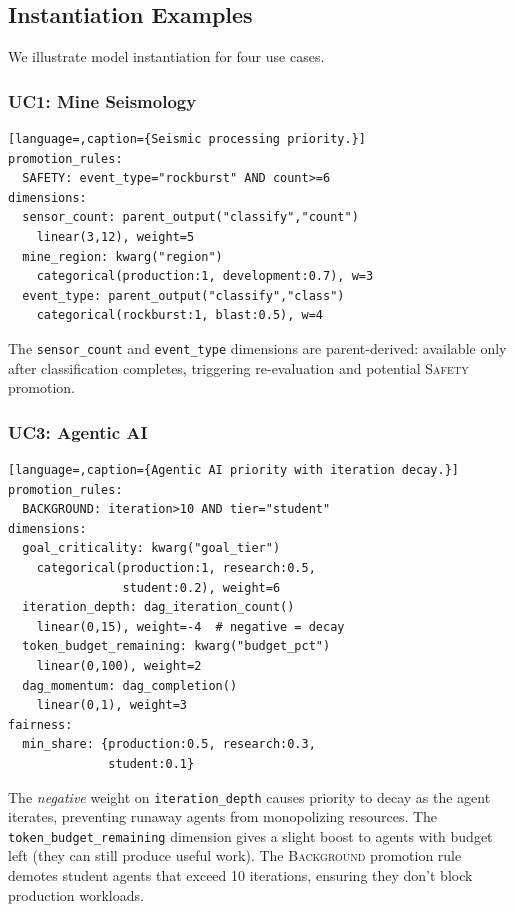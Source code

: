 \documentclass[conference]{IEEEtran}
\begin{document}
\subsection{Instantiation Examples}

We illustrate model instantiation for four use cases.

\subsubsection{UC1: Mine Seismology}

\begin{lstlisting}[language=,caption={Seismic processing priority.}]
promotion_rules:
  SAFETY: event_type="rockburst" AND count>=6
dimensions:
  sensor_count: parent_output("classify","count")
    linear(3,12), weight=5
  mine_region: kwarg("region")
    categorical(production:1, development:0.7), w=3
  event_type: parent_output("classify","class")
    categorical(rockburst:1, blast:0.5), w=4
\end{lstlisting}

The \texttt{sensor\_count} and \texttt{event\_type} dimensions are parent-derived: available only after classification completes, triggering re-evaluation and potential \textsc{Safety} promotion.

\subsubsection{UC3: Agentic AI}

\begin{lstlisting}[language=,caption={Agentic AI priority with iteration decay.}]
promotion_rules:
  BACKGROUND: iteration>10 AND tier="student"
dimensions:
  goal_criticality: kwarg("goal_tier")
    categorical(production:1, research:0.5,
                student:0.2), weight=6
  iteration_depth: dag_iteration_count()
    linear(0,15), weight=-4  # negative = decay
  token_budget_remaining: kwarg("budget_pct")
    linear(0,100), weight=2
  dag_momentum: dag_completion()
    linear(0,1), weight=3
fairness:
  min_share: {production:0.5, research:0.3,
              student:0.1}
\end{lstlisting}

The \emph{negative} weight on \texttt{iteration\_depth} causes priority to decay as the agent iterates, preventing runaway agents from monopolizing resources. The \texttt{token\_budget\_remaining} dimension gives a slight boost to agents with budget left (they can still produce useful work). The \textsc{Background} promotion rule demotes student agents that exceed 10 iterations, ensuring they don't block production workloads.
\end{document}
